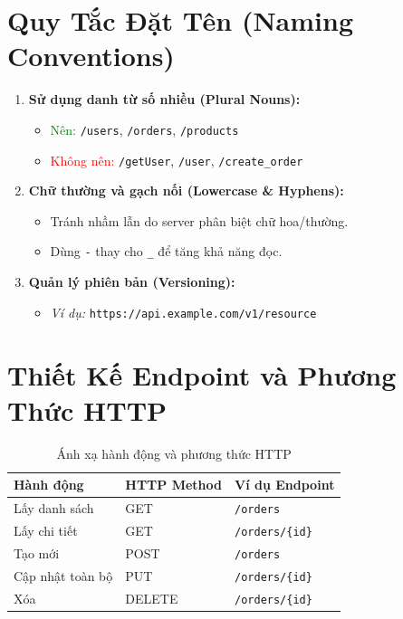 \documentclass[12pt, a4paper]{article}
\begin{document}
\section{Quy Tắc Đặt Tên (Naming Conventions)}
\begin{enumerate}
    \item \textbf{Sử dụng danh từ số nhiều (Plural Nouns):}
    \begin{itemize}
        \item \textcolor{green}{Nên:} \texttt{/users}, \texttt{/orders}, \texttt{/products}
        \item \textcolor{red}{Không nên:} \texttt{/getUser}, \texttt{/user}, \texttt{/create\_order}
    \end{itemize}
    
    \item \textbf{Chữ thường và gạch nối (Lowercase \& Hyphens):} 
    \begin{itemize}
        \item Tránh nhầm lẫn do server phân biệt chữ hoa/thường.
        \item Dùng \texttt{-} thay cho \texttt{\_} để tăng khả năng đọc.
    \end{itemize}

    \item \textbf{Quản lý phiên bản (Versioning):} 
    \begin{itemize}
        \item \textit{Ví dụ:} \texttt{https://api.example.com/v1/resource}
    \end{itemize}
\end{enumerate}

\section{Thiết Kế Endpoint và Phương Thức HTTP}
\begin{table}[h]
\centering
\begin{tabularx}{\textwidth}{|l|l|X|}
\hline
\textbf{Hành động} & \textbf{HTTP Method} & \textbf{Ví dụ Endpoint} \\ \hline
Lấy danh sách & GET & \texttt{/orders} \\ \hline
Lấy chi tiết & GET & \texttt{/orders/\{id\}} \\ \hline
Tạo mới & POST & \texttt{/orders} \\ \hline
Cập nhật toàn bộ & PUT & \texttt{/orders/\{id\}} \\ \hline
Xóa & DELETE & \texttt{/orders/\{id\}} \\ \hline
\end{tabularx}
\caption{Ánh xạ hành động và phương thức HTTP}
\end{table}
\end{document}
